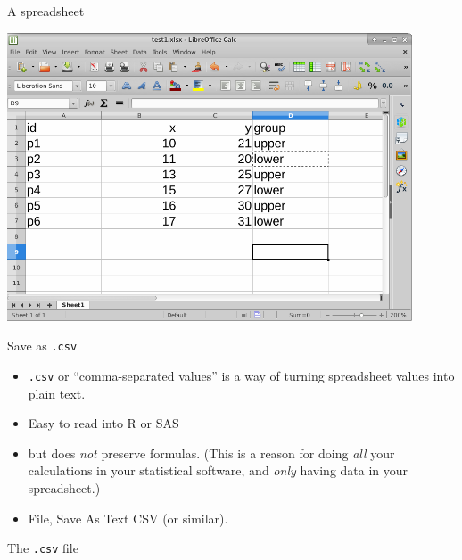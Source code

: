 \documentclass[unknownkeysallowed]{beamer}\usepackage[]{graphicx}\usepackage[]{color}
\begin{document}
\begin{frame}[fragile]{A spreadsheet}
  
  \includegraphics[width=0.9\textwidth]{spreadsheet}
  
\end{frame}

\begin{frame}[fragile]{Save as \texttt{.csv}}
  
  \begin{itemize}
  \item \texttt{.csv} or ``comma-separated values'' is a way of
    turning spreadsheet values into plain text.
  \item Easy to read into R or SAS
  \item but does \emph{not} preserve formulas. (This is a reason for
    doing \emph{all} your calculations in your statistical software,
    and \emph{only} having data in your spreadsheet.)
  \item File, Save As Text CSV (or similar).
  \end{itemize}
  
\end{frame}

\begin{frame}[fragile]{The \texttt{.csv} file}
  

  
\end{frame}
\end{document}
